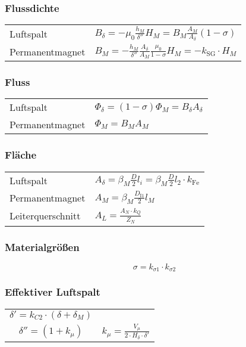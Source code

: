 \begin{sectionbox}
\subsubsection{Flussdichte}
\begin{tabular}{ll}
Luftspalt & $B_\delta = -\mu_0 \frac{h_M}{\delta''}H_M = B_M \frac{A_M}{A_\delta}(1-\sigma)$\\
Permanentmagnet & $B_M = -\frac{h_M}{\delta''} \frac{A_\delta}{A_M} \frac{\mu_0}{1-\sigma} H_M = -k_\text{SG} \cdot H_M$
\end{tabular}

\subsubsection{Fluss}
\begin{tabularx}{\columnwidth}{lX}
Luftspalt & $\Phi_\delta = (1-\sigma)\Phi_M = B_\delta A_\delta$\\
Permanentmagnet & $\Phi_M = B_M A_M$
\end{tabularx}

\subsubsection{Fläche}
\begin{tabularx}{\columnwidth}{lX}
Luftspalt & $A_\delta = \beta_M \frac{D}{2}l_i = \beta_M\frac{D}{2}l_2\cdot k_\text{Fe}$\\
Permanentmagnet & $A_M = \beta_M \frac{D_\text{I1}}{2}l_M$\\
Leiterquerschnitt & $A_L = \frac{A_N \cdot k_Q}{Z_N}$
\end{tabularx}

\subsubsection{Materialgrößen}
\[\sigma = k_{\sigma 1}\cdot k_{\sigma 2}\]

\subsubsection{Effektiver Luftspalt}
\begin{tabularx}{\columnwidth}{CC}
$\delta' = k_{C2}\cdot(\delta + \delta_M)$ & \\
$\delta'' = (1 + k_\mu)$ & $k_\mu = \frac{V_\mu}{2\cdot H_\delta\cdot\delta'}$
\end{tabularx}
\end{sectionbox}


